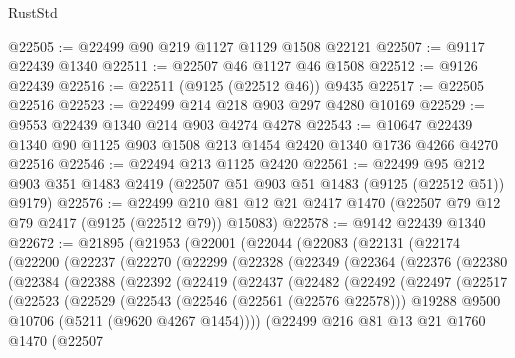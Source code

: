 \begin{lexlean}{RustStd}
\begin{coremodule}
@22505 := @22499 @90 @219 @1127 @1129 @1508 @22121
@22507 := @9117 @22439 @1340
@22511 := @22507 @46 @1127 @46 @1508
@22512 := @9126 @22439
@22516 := @22511 (@9125 (@22512 @46)) @9435
@22517 := @22505 @22516
@22523 := @22499 @214 @218 @903 @297 @4280 @10169
@22529 := @9553 @22439 @1340 @214 @903 @4274 @4278
@22543 := @10647 @22439 @1340 @90 @1125 @903 @1508 @213 @1454 @2420 @1340 @1736 @4266 @4270 @22516
@22546 := @22494 @213 @1125 @2420
@22561 := @22499
    @95
    @212
    @903
    @351
    @1483
    @2419
    (@22507 @51 @903 @51 @1483 (@9125 (@22512 @51)) @9179)
@22576 := @22499 @210 @81 @12 @21 @2417 @1470 (@22507 @79 @12 @79 @2417 (@9125 (@22512 @79)) @15083)
@22578 := @9142 @22439 @1340
@22672 := @21895
    (@21953
      (@22001
        (@22044
          (@22083
            (@22131
              (@22174
                (@22200
                  (@22237
                    (@22270
                      (@22299
                        (@22328
                          (@22349
                            (@22364
                              (@22376
                                (@22380
                                  (@22384
                                    (@22388
                                      (@22392
                                        (@22419
                                          (@22437
                                            (@22482
                                              (@22492
                                                (@22497
                                                  (@22517
                                                    (@22523
                                                      (@22529
                                                        (@22543
                                                          (@22546 (@22561 (@22576 @22578)))
                                                          @19288
                                                          @9500
                                                          @10706
                                                          (@5211 (@9620 @4267 @1454))))
                                                      (@22499
                                                        @216
                                                        @81
                                                        @13
                                                        @21
                                                        @1760
                                                        @1470
                                                        (@22507

\end{coremodule}
\end{lexlean}
